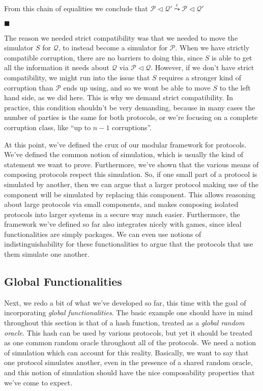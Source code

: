 \begin{theorem}
  From this chain of equalities we conclude that
  $\mathscr{P} \lhd \mathscr{Q}' \overset{\epsilon}{\leadsto} \mathscr{P} \lhd \mathscr{Q}'$

  $\blacksquare$
\end{theorem}

The reason we needed strict compatibility was that we needed
to move the simulator $S$ for $\mathscr{Q}$, to instead
become a simulator for $\mathscr{P}$.
When we have strictly compatible corruption, there are no barriers
to doing this, since $S$ is able to get all the information
it needs about $\mathscr{Q}$ via $\mathscr{P} \lhd \mathscr{Q}$.
However, if we don't have strict compatibility,
we might run into the issue that $S$ requires a stronger kind
of corruption than $\mathscr{P}$ ends up using,
and so we wont be able to move $S$ to the left hand side,
as we did here.
This is why we demand strict compatibility.
In practice, this condition shouldn't be very demanding,
because in many cases the number of parties is the same for both protocols,
or we're focusing on a complete corruption class, like ``up to $n - 1$ corruptions''.

At this point, we've defined the crux of our modular framework for protocols.
We've defined the common notion of simulation, which is usually
the kind of statement we want to prove.
Furthermore, we've shown that the various means of composing
protocols respect this simulation.
So, if one small part of a protocol is simulated by another,
then we can argue that a larger protocol making use of the component
will be simulated by replacing this component.
This allows reasoning about large protocols via small components,
and makes composing isolated protocols into larger systems
in a secure way much easier.
Furthermore, the framework we've defined so far
also integrates nicely with games, since ideal functionalities
are simply packages.
We can even use notions of indistinguishability for these functionalities
to argue that the protocols that use them simulate one another.

\subsection{Global Functionalities}

Next, we redo a bit of what we've developed so far, this time
with the goal of incorporating \emph{global functionalities}.
The basic example one should have in mind throughout this section
is that of a hash function, treated as a \emph{global random oracle}.
This hash can be used by various protocols, but yet it should
be treated as one common random oracle throughout all of the protocols.
We need a notion of simulation which can account for this reality.
Basically, we want to say that one protocol simulates another,
even in the presence of a shared random oracle,
and this notion of simulation should have the nice composability properties
that we've come to expect.

